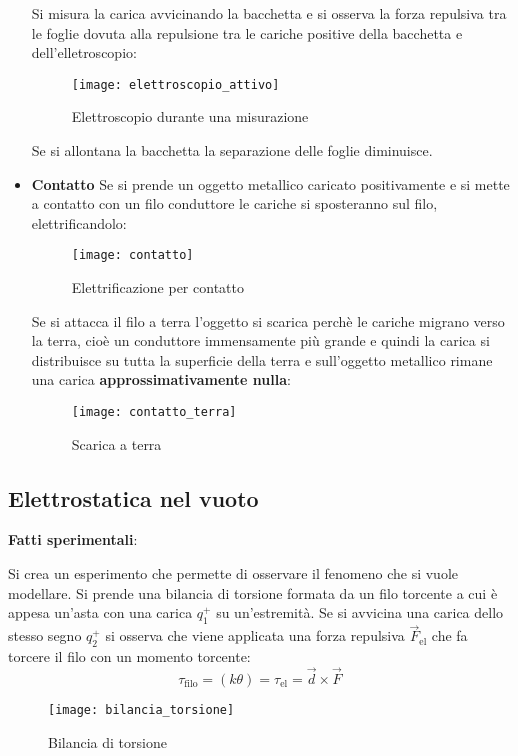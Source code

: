\documentclass[a4paper]{article}
\begin{document}
\begin{itemize}
    Si misura la carica avvicinando la bacchetta e si osserva la forza repulsiva tra le
    foglie dovuta alla repulsione tra le cariche positive della bacchetta e
    dell'elletroscopio:
    \begin{figure}[H]
      \centering
      \texttt{[image: elettroscopio\_attivo]}
      \caption{Elettroscopio durante una misurazione}
    \end{figure}
    Se si allontana la bacchetta la separazione delle foglie diminuisce.
  \item \textbf{Contatto}
    Se si prende un oggetto metallico caricato positivamente e si mette a
    contatto con un filo conduttore le cariche si sposteranno sul filo, elettrificandolo:
    \begin{figure}[H]
      \centering
      \texttt{[image: contatto]}
      \caption{Elettrificazione per contatto}
    \end{figure}
    Se si attacca il filo a terra l'oggetto si scarica perchè le cariche migrano verso
    la terra, cioè un conduttore immensamente più grande e quindi la carica si distribuisce
    su tutta la superficie della terra e sull'oggetto metallico rimane una carica
    \textbf{approssimativamente nulla}:
    \begin{figure}[H]
      \centering
      \texttt{[image: contatto\_terra]}
      \caption{Scarica a terra}
    \end{figure}
\end{itemize}

\subsection{Elettrostatica nel vuoto}
\textbf{Fatti sperimentali}:

\vspace{1em}
\noindent
Si crea un esperimento che permette di osservare il fenomeno che si vuole modellare.
Si prende una bilancia di torsione formata da un filo torcente a cui è appesa un'asta 
con una carica \( q^+_1 \) su un'estremità. Se si avvicina una carica dello stesso
segno \( q^+_2 \) si osserva che viene applicata una forza repulsiva \( \vec{F}_{\text{el}} \)
che fa torcere il filo con un momento torcente:
\[
  \tau_{\text{filo}} = (k \theta) = \tau_{\text{el}} = \vec{d} \times \vec{F}
\]
\begin{figure}[H]
  \centering
  \texttt{[image: bilancia\_torsione]}
  \caption{Bilancia di torsione}
\end{figure}
\end{document}
